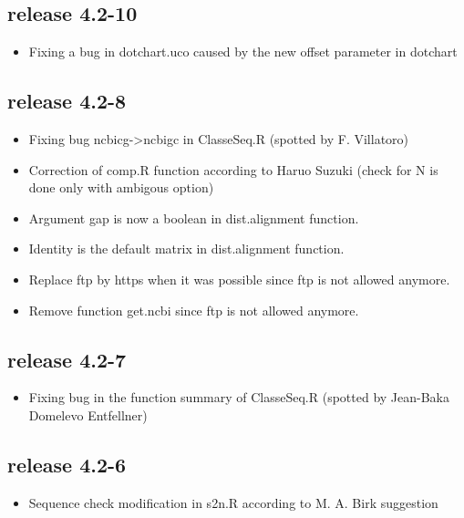\documentclass{article}
\begin{document}
\subsection*{release 4.2-10}
\begin{itemize}
\item Fixing a bug in dotchart.uco caused by the new offset parameter in dotchart
\end{itemize}


\subsection*{release 4.2-8}
\begin{itemize}
\item Fixing bug ncbicg->ncbigc in ClasseSeq.R (spotted by F. Villatoro)
\item  Correction of comp.R function according to  Haruo Suzuki (check for N is done only with ambigous option)
\item Argument gap is now a boolean in dist.alignment function.
\item Identity is the default matrix in dist.alignment function.
\item Replace ftp by https when it was possible since ftp is not allowed  anymore.
\item Remove function get.ncbi  since ftp is not allowed  anymore.
\end{itemize}


\subsection*{release 4.2-7}
\begin{itemize}


\item Fixing bug in the function  summary of ClasseSeq.R (spotted by Jean-Baka Domelevo Entfellner)

\end{itemize}




\subsection*{release 4.2-6}
\begin{itemize}

\item Sequence check modification in  s2n.R according to M. A. Birk suggestion

\end{itemize}
\end{document}
